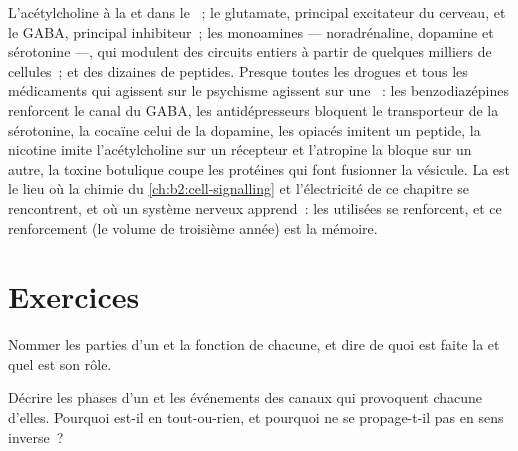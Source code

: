 \begin{example}\label{ex:b2:neurons-synapses:transmitters}
L'acétylcholine à la  et dans le ~; le glutamate, principal  excitateur
du cerveau, et le GABA, principal  inhibiteur~; les
monoamines --- noradrénaline, dopamine et sérotonine ---, qui modulent
des circuits entiers à partir de quelques milliers de cellules~; et des
dizaines de peptides. Presque toutes les drogues et tous les médicaments
qui agissent sur le psychisme agissent sur une ~: les
benzodiazépines renforcent le canal du GABA, les antidépresseurs bloquent
le transporteur de la sérotonine, la cocaïne celui de la dopamine, les
opiacés imitent un peptide, la nicotine imite l'acétylcholine sur un
récepteur et l'atropine la bloque sur un autre, la toxine botulique
coupe les protéines qui font fusionner la vésicule. La  est le
lieu où la chimie du \cref{ch:b2:cell-signalling} et l'électricité de
ce chapitre se rencontrent, et où un système nerveux apprend~: les
 utilisées se renforcent, et ce renforcement (le volume de
troisième année) est la mémoire.
\end{example}

\section{Exercices}

\begin{exercise}[$\star$]\label{exo:b2:neurons-synapses:1}
Nommer les parties d'un  et la fonction de chacune, et dire de
quoi est faite la  et quel est son rôle.
\end{exercise}

\begin{exercise}[$\star$]\label{exo:b2:neurons-synapses:2}
Décrire les phases d'un  et les événements des canaux
qui provoquent chacune d'elles. Pourquoi est-il en tout-ou-rien, et
pourquoi ne se propage-t-il pas en sens inverse~?
\end{exercise}

